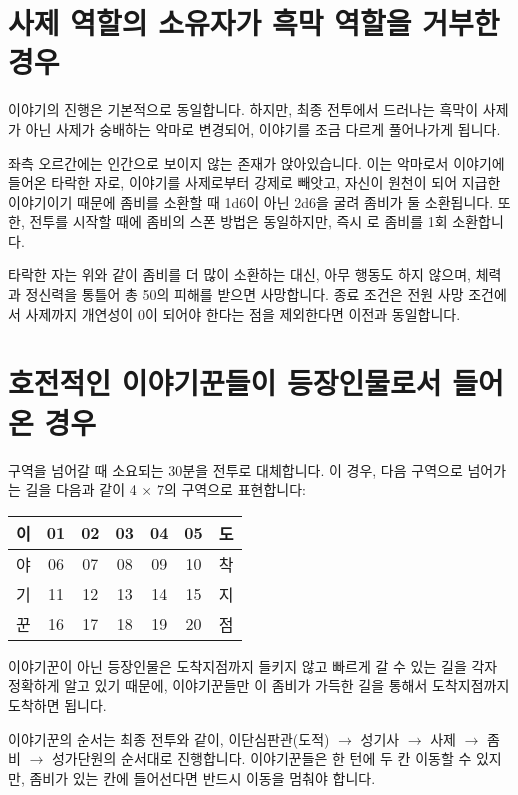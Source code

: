 \documentclass{report}
\begin{document}
	\hypertarget{alternative:no-criminal}{}
	\section{사제 역할의 소유자가 흑막 역할을 거부한 경우}
		이야기의 진행은 기본적으로 동일합니다. 하지만, 최종 전투에서 드러나는 흑막이 사제가 아닌 사제가 숭배하는 악마로 변경되어, 이야기를 조금 다르게 풀어나가게 됩니다.
		
		좌측 오르간에는 인간으로 보이지 않는 존재가 앉아있습니다. 이는 악마로서 이야기에 들어온 타락한 자로,  이야기를 사제로부터 강제로 빼앗고, 자신이 원천이 되어 지급한 이야기이기 때문에 좀비를 소환할 때 1d6이 아닌 2d6을 굴려 좀비가 둘 소환됩니다. 또한, 전투를 시작할 때에 좀비의 스폰 방법은 동일하지만, 즉시 로 좀비를 1회 소환합니다.
		
		타락한 자는 위와 같이 좀비를 더 많이 소환하는 대신, 아무 행동도 하지 않으며, 체력과 정신력을 통틀어 총 50의 피해를 받으면 사망합니다. 종료 조건은 전원 사망 조건에서 사제까지 개연성이 0이 되어야 한다는 점을 제외한다면 이전과 동일합니다.
	
	\hypertarget{alternative:war-ready}{}
	\section{호전적인 이야기꾼들이 등장인물로서 들어온 경우}
		구역을 넘어갈 때 소요되는 30분을 전투로 대체합니다. 이 경우, 다음 구역으로 넘어가는 길을 다음과 같이 4 $\times$ 7의 구역으로 표현합니다:
		
		\begin{center}
			\begin{tabular}{|c|c|c|c|c|c|c|}
				\hline
				이 & 01 & 02 & 03 & 04 & 05 & 도 \\\hline
				야 & 06 & 07 & 08 & 09 & 10 & 착 \\\hline
				기 & 11 & 12 & 13 & 14 & 15 & 지 \\\hline
				꾼 & 16 & 17 & 18 & 19 & 20 & 점 \\\hline
			\end{tabular}
		\end{center}
		
		이야기꾼이 아닌 등장인물은 도착지점까지 들키지 않고 빠르게 갈 수 있는 길을 각자 정확하게 알고 있기 때문에, 이야기꾼들만 이 좀비가 가득한 길을 통해서 도착지점까지 도착하면 됩니다.
		
		이야기꾼의 순서는 최종 전투와 같이, 이단심판관(도적) $\rightarrow$ 성기사 $\rightarrow$ 사제 $\rightarrow$ 좀비 $\rightarrow$ 성가단원의 순서대로 진행합니다. 이야기꾼들은 한 턴에 두 칸 이동할 수 있지만, 좀비가 있는 칸에 들어선다면 반드시 이동을 멈춰야 합니다.
		
\end{document}
